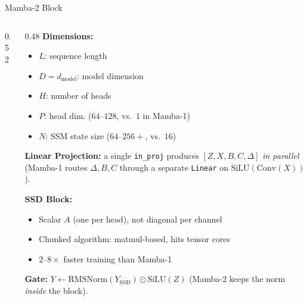 \begin{frame}{Mamba-2 Block~\cite{dao2024mamba2}}
\begin{columns}[T,onlytextwidth]
\begin{column}{0.52\textwidth}
\begin{center}
      \end{center}
    \end{column}
    \begin{column}{0.48\textwidth}
      \small
      \textbf{Dimensions:}
      \begin{itemize}
        \item $L$: sequence length
        \item $D = d_{\text{model}}$: model dimension
        \item $H$: number of heads
        \item $P$: head dim. ($64$--$128$, vs.\ $1$ in Mamba-1)
        \item $N$: SSM state size ($64$--$256{+}$, vs.\ $16$)
      \end{itemize}

      \vspace{0.3em}
      \textbf{Linear Projection:} a single \texttt{in\_proj} produces $[Z, X, B, C, \Delta]$ \emph{in parallel} (Mamba-1 routes $\Delta, B, C$ through a separate \texttt{Linear} on $\mathrm{SiLU}(\mathrm{Conv}(X))$).

      \vspace{0.3em}
      \textbf{SSD Block:}
      \begin{itemize}
        \item Scalar $A$ (one per head), not diagonal per channel
        \item Chunked algorithm: matmul-based, hits tensor cores
        \item \alert{$2$--$8\times$} faster training than Mamba-1
      \end{itemize}

      \vspace{0.3em}
      \textbf{Gate:} $Y \gets \mathrm{RMSNorm}(Y_{\text{SSD}}) \odot \mathrm{SiLU}(Z)$ (Mamba-2 keeps the norm \emph{inside} the block).
    \end{column}
  \end{columns}
\end{frame}


